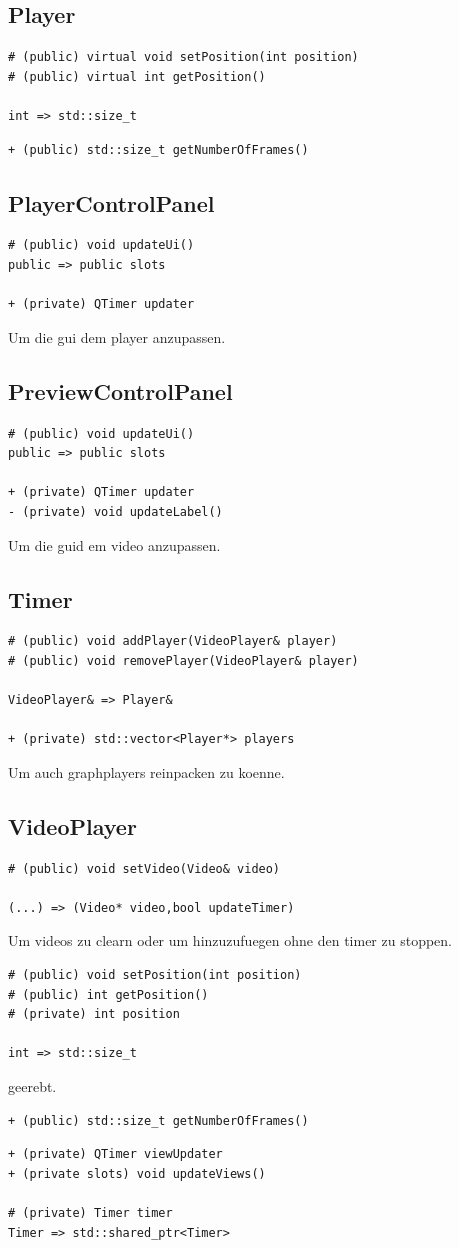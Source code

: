 \documentclass[parskip=full]{scrartcl}
\begin{document}
\subsection{Player}
\begin{verbatim}
# (public) virtual void setPosition(int position)
# (public) virtual int getPosition()

int => std::size_t
\end{verbatim}
\begin{verbatim}
+ (public) std::size_t getNumberOfFrames()
\end{verbatim}
\subsection{PlayerControlPanel}
\begin{verbatim}
# (public) void updateUi()
public => public slots

+ (private) QTimer updater
\end{verbatim}
Um die gui dem player anzupassen.
\subsection{PreviewControlPanel}
\begin{verbatim}
# (public) void updateUi()
public => public slots

+ (private) QTimer updater
- (private) void updateLabel()
\end{verbatim}
Um die guid em video anzupassen.
\subsection{Timer}
\begin{verbatim}
# (public) void addPlayer(VideoPlayer& player)
# (public) void removePlayer(VideoPlayer& player)

VideoPlayer& => Player&

+ (private) std::vector<Player*> players
\end{verbatim}
Um auch graphplayers reinpacken zu koenne.
\subsection{VideoPlayer}
\begin{verbatim}
# (public) void setVideo(Video& video)

(...) => (Video* video,bool updateTimer)
\end{verbatim}
Um videos zu clearn oder um hinzuzufuegen ohne den timer zu stoppen.
\begin{verbatim}
# (public) void setPosition(int position)
# (public) int getPosition()
# (private) int position

int => std::size_t
\end{verbatim}
geerebt.
\begin{verbatim}
+ (public) std::size_t getNumberOfFrames()
\end{verbatim}
\begin{verbatim}
+ (private) QTimer viewUpdater
+ (private slots) void updateViews()

# (private) Timer timer
Timer => std::shared_ptr<Timer>
\end{verbatim}
\end{document}

